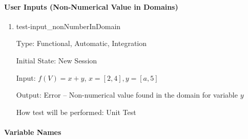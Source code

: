 \documentclass[12pt, titlepage]{article}
\begin{document}
\paragraph{User Inputs (Non-Numerical Value in Domains)}

\begin{enumerate}
	
	\item{test-input\_nonNumberInDomain}
	
	Type: Functional, Automatic, Integration
	
	Initial State: New Session
	
	Input: $f(V) = x + y$, $x = [2,4], y = [a,5]$
	
	Output: Error -- Non-numerical value found in the domain for variable $y$
	
	How test will be performed: Unit Test\\
	
\end{enumerate}

\paragraph{Variable Names}
\end{document}
